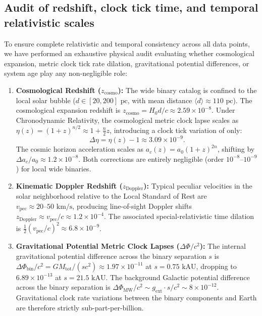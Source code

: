 \documentclass[aps,prd,reprint,superscriptaddress,nofootinbib,floatfix,amsmath,amssymb]{revtex4-2}
\begin{document}
\subsection{Audit of redshift, clock tick time, and temporal relativistic scales}
\label{subsec:redshift_tick_time_audit}

To ensure complete relativistic and temporal consistency across all data points, we have performed an exhaustive physical audit evaluating whether cosmological expansion, metric clock tick rate dilation, gravitational potential differences, or system age play any non-negligible role:
\begin{enumerate}
\item \textbf{Cosmological Redshift ($z_{\text{cosmo}}$):} The wide binary catalog is confined to the local solar bubble ($d \in [20, 200]\text{ pc}$, with mean distance $\langle d \rangle \approx 110\text{ pc}$). The cosmological expansion redshift is $z_{\text{cosmo}} = H_0 d / c \approx 2.59 \times 10^{-8}$. Under Chronodynamic Relativity, the cosmological metric clock lapse scales as $\eta(z) = (1+z)^{n/2} \approx 1 + \frac{n}{2} z$, introducing a clock tick variation of only:
\begin{equation}
\Delta\eta = \eta(z) - 1 \approx 3.09 \times 10^{-9}.
\end{equation}
The cosmic horizon acceleration scales as $a_c(z) = a_0 (1+z)^{2n}$, shifting by $\Delta a_c / a_0 \approx 1.2 \times 10^{-8}$. Both corrections are entirely negligible (order $10^{-8}\text{--}10^{-9}$) for local wide binaries.
\item \textbf{Kinematic Doppler Redshift ($z_{\text{Doppler}}$):} Typical peculiar velocities in the solar neighborhood relative to the Local Standard of Rest are $v_{\text{pec}} \approx 20\text{--}50\text{ km/s}$, producing line-of-sight Doppler shifts $z_{\text{Doppler}} \approx v_{\text{pec}} / c \approx 1.2 \times 10^{-4}$. The associated special-relativistic time dilation is $\frac{1}{2}(v_{\text{pec}}/c)^2 \approx 6.8 \times 10^{-9}$.
\item \textbf{Gravitational Potential Metric Clock Lapses ($\Delta\Phi / c^2$):} The internal gravitational potential difference across the binary separation $s$ is $\Delta\Phi_{\text{bin}} / c^2 = G M_{\text{tot}} / (s c^2) \approx 1.97 \times 10^{-11}$ at $s = 0.75\text{ kAU}$, dropping to $6.89 \times 10^{-13}$ at $s = 21.5\text{ kAU}$. The background Galactic potential difference across the binary separation is $\Delta\Phi_{\text{MW}} / c^2 \sim g_{\text{ext}} \cdot s / c^2 \sim 8 \times 10^{-12}$. Gravitational clock rate variations between the binary components and Earth are therefore strictly sub-part-per-billion.

\end{enumerate}
\end{document}

